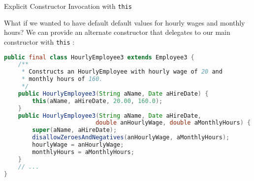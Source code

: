 \documentclass{beamer}
\begin{document}



\begin{frame}[fragile]{Explicit Constructor Invocation with {\tt this}}


What if we wanted to have default default values for hourly wages and monthly hours?  We can provide an alternate constructor that delegates to our main constructor with {\tt this} :
\begin{lstlisting}[language=Java]
public final class HourlyEmployee3 extends Employee3 {
    /**
     * Constructs an HourlyEmployee with hourly wage of 20 and
     * monthly hours of 160.
     */
    public HourlyEmployee3(String aName, Date aHireDate) {
        this(aName, aHireDate, 20.00, 160.0);
    }
    public HourlyEmployee3(String aName, Date aHireDate,
                          double anHourlyWage, double aMonthlyHours) {
        super(aName, aHireDate);
        disallowZeroesAndNegatives(anHourlyWage, aMonthlyHours);
        hourlyWage = anHourlyWage;
        monthlyHours = aMonthlyHours;
    }
    // ...
}
\end{lstlisting}

\end{frame}
\end{document}
